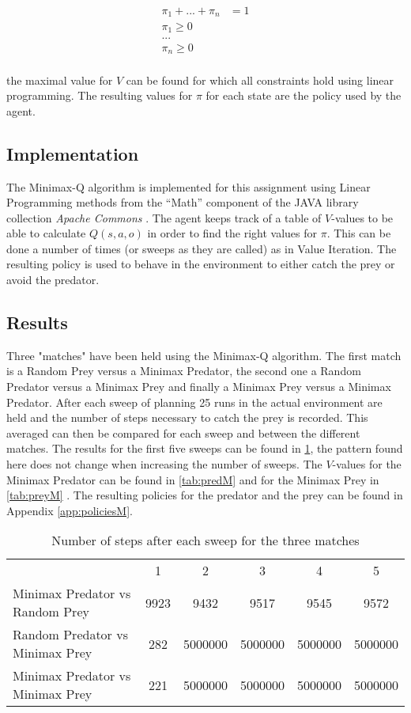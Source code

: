 \begin{align*}
\pi_1 + ... + \pi_n &= 1\\
\pi_1 \geq 0\\
...\\
\pi_n  \geq 0\\
\end{align*}

the maximal value for $V$ can be found for which all constraints hold using linear programming. The resulting values for $\pi$ for each state are the policy used by the agent.

\subsection{Implementation}
The Minimax-Q algorithm is implemented for this assignment using Linear Programming  methods from the ``Math'' component of the JAVA library collection \emph{Apache Commons} \cite{commonsmath}. The agent keeps track of a table of $V$-values to be able to calculate $Q(s,a,o)$ in order to find the right values for $\pi$. This can be done a number of times (or sweeps as they are called) as in Value Iteration. The resulting policy is used to behave in the environment to either catch the prey or avoid the predator.

\subsection{Results}
Three "matches" have been held using the Minimax-Q algorithm. The first match is a Random Prey versus a Minimax Predator, the second one a Random Predator versus a Minimax Prey and finally a Minimax Prey versus a Minimax Predator. After each sweep of planning 25 runs in the actual environment are held and the number of steps necessary to catch the prey is recorded. This averaged can then be compared for each sweep and between the different matches. The results for the first five sweeps can be found in \ref{tab:minimaxTable}, the pattern found here does not change when increasing the number of sweeps. The $V$-values for the Minimax Predator can be found in \ref{tab:predM} and for the Minimax Prey in \ref{tab:preyM} .  The resulting policies for the predator and the prey can be found in Appendix \ref{app:policiesM}.\\

\begin{table}[htb]
\centering
\begin{tabular}{lccccc}
&1&2&3&4&5\\
Minimax Predator vs Random Prey & 9923 & 9432&9517&9545&9572\\
Random Predator vs Minimax Prey & 282& 5000000& 5000000& 5000000& 5000000\\
Minimax Predator vs Minimax Prey & 221& 5000000& 5000000& 5000000& 5000000\\
\end{tabular}
\caption{Number of steps after each sweep for the three matches}
\label{tab:minimaxTable}
\end{table}

